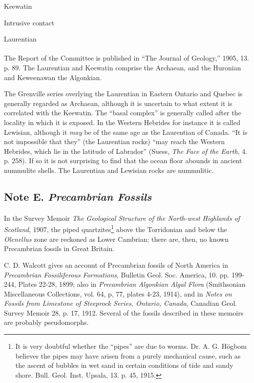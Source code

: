 \documentclass[a4paper, 12pt, oneside]{article}
\begin{document}
Keewatin

\hspace{10mm}Intrusive contact

Laurentian

\paragraph{}
The Report of the Committee is published in ``The Journal of Geology,'' 1905, 13. p. 89. The Laurentian and Keewatin comprise the Archaean, and the Huronian and Keweenawan the Algonkian.

The Grenville series overlying the Laurentian in Eastern Ontario and Quebec is generally regarded as Archaean, although it is uncertain to what extent it is correlated with the Keewatin. The ``basal complex'' is generally called after the locality in which it is exposed. In the Western Hebrides for instance it is called Lewisian, although it \emph{may} be of the same age as the Laurentian of Canada. ``It is not impossible that they'' (the Laurentian rocks) ``may reach the Western Hebrides, which lie in the latitude of Labrador'' (Suess, \emph{The Face of the Earth}, 4. p. 258). If so it is not surprising to find that the ocean floor abounds in ancient nummulite shells. The Laurentian and Lewisian rocks are nummulitic.

\subsection{Note E. \emph{Precambrian Fossils}}
\paragraph{}
In the Survey Memoir \emph{The Geological Structure of the North-west Highlands of Scotland}, 1907, the piped quartzites\footnote{It is very doubtful whether the ``pipes'' are due to worms. Dr. A. G. Högbom believes the pipes may have arisen from a purely mechanical cause, such as the ascent of bubbles in wet sand in certain conditions of tide and sandy shore. Bull. Geol. Inst. Upsala, 13. p. 45, 1915.} above the Torridonian and below the \emph{Olenellus} zone are reckoned as Lower Cambrian; there are, then, no known Precambrian fossils in Great Britain.

C. D. Walcott gives an account of Precambrian fossils of North America in \emph{Precambrian Fossiliferous Formations}, Bulletin Geol. Soc. America, 10. pp. 199-244, Plates 22-28, 1899; also in \emph{Precambrian Algonkian Algal Flora} (Smithsonian Miscellaneous Collections, vol. 64, p, 77, plates 4-23, 1914), and in \emph{Notes on Fossils from Limestone of Steeprock Series, Ontario, Canada}, Canadian Geol. Survey Memoir 28, p. 17, 1912. Several of the fossils described in these memoirs are probably pseudomorphs.
\end{document}
